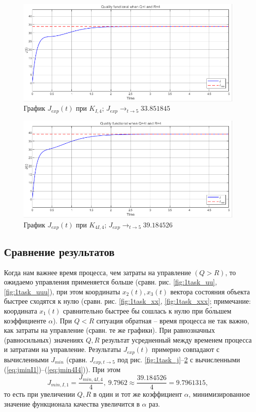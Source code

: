 \documentclass[a4paper, 12pt]{article}
\begin{document}
    \begin{figure}[H]
        \centering
        \includegraphics[scale=0.75]{1task_jjj.png}
        \captionsetup{skip=0pt}
        \caption{График $J_{exp}(t)$ при $K_{I,4}$; $J_{exp}\rightarrow_{t\to5} 33.851845$}
        \label{fig:1task_jjj}
    \end{figure}
    \begin{figure}[H]
        \centering
        \includegraphics[scale=0.75]{1task_jjjj.png}
        \captionsetup{skip=0pt}
        \caption{График $J_{exp}(t)$ при $K_{4I,4}$; $J_{exp}\rightarrow_{t\to5} 39.184526$}
        \label{fig:1task_jjjj}
    \end{figure}


    \subsection{Сравнение результатов}
    Когда нам важнее время процесса, чем затраты на управление $(Q>R)$, то
    ожидаемо управления применяется больше (сравн. рис. \ref{fig:1task_uu}, \ref{fig:1task_uuu}),
    при этом координаты $x_2(t),x_3(t)$ вектора состояния объекта быстрее сходятся к нулю (сравн. рис. \ref{fig:1task_xx}, \ref{fig:1task_xxx};
    примечание: координата $x_1(t)$ сравнительно быстрее бы сошлась к нулю при б\'{о}льшем коэффициенте $\alpha$).
    При $Q<R$ ситуация обратная -- время процесса не так важно, как затраты на управление (сравн. те же графики).
    При равнозначных (равносильных) значениях $Q,R$ результат усредненный между временем процесса и затратами на управление.
    Результаты $J_{exp}(t)$ примерно совпадают с вычисленными $J_{min}$ (сравн. $J_{exp,t\to5}$ под рис. \ref{fig:1task_j}--\ref{fig:1task_jjjj} с вычисленными (\ref{eq:jminI1})--(\ref{eq:jmin4I4})). При этом
    $$J_{min,I,1}=\dfrac{J_{min,4I,4}}{4},\ 9.7962\approx\dfrac{39.184526}{4}=9.7961315,$$ то есть при увеличении
    $Q,R$ в один и тот же коэффициент $\alpha$, минимизированное значение функционала качества увеличится в
    $\alpha$ раз.
\end{document}
